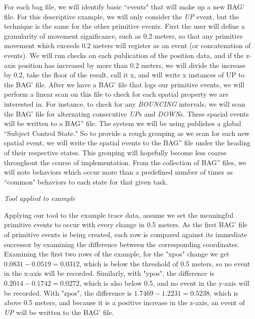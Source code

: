 \documentclass{article}
\begin{document}
For each bag file, we will identify basic ``events" that will make up a new BAG' file.  
For this descriptive example, we will only consider the \emph{UP} event, but the technique is the same for the other primitive events.  
First the user will define a granularity of movement significance, such as 0.2 meters, so that any primitive movement which exceeds 0.2 meters will register as an event (or concatenation of events).
We will run checks on each publication of the position data, and if the z-axis position has increased by more than 0.2 meters, we will divide the increase by 0.2, take the floor of the result, call it x, and will write x instances of UP to the BAG' file.  
After we have a BAG' file that logs our primitive events, we will perform a linear scan on this file to check for each spatial property we are interested in.  
For instance, to check for any \emph{BOUNCING} intervals, we will scan the BAG' file for alternating consecutive \emph{UP}s and \emph{DOWN}s. 
These spacial events will be written to a BAG'' file.
The system we will be using publishes a global ``Subject Control State."
So to provide a rough grouping as we scan for each new spatial event, we will write the spatial events to the BAG'' file under the heading of their respective states.
This grouping will hopefully become less coarse throughout the course of implementation.
From the collection of BAG'' files, we will note behaviors which occur more than a predefined number of times as ``common" behaviors to each state for that given task.

\emph{Tool applied to example}


Applying our tool to the example trace data, assume we set the meaningful primitive events to occur with every change in 0.5 meters. 
As the first BAG' file of primitive events is being created, each row is compared against its immediate successor by examining the difference between the corresponding coordinates.
Examining the first two rows of the example, for the "xpos" change we get $0.0831-0.0519=0.0312$, which is below the threshold of 0.5 meters, so no event in the x-axis will be recorded.  
Similarly, with "ypos", the difference is $0.2014-0.1742=0.0272$, which is also below 0.5, and no event in the y-axis will be recorded.
With "zpos", the difference is $1.7469-1.2231=0.5238$, which is above 0.5 meters, and because it is a positive increase in the z-axis, an event of \emph{UP} will be written to the BAG' file.
\end{document}
